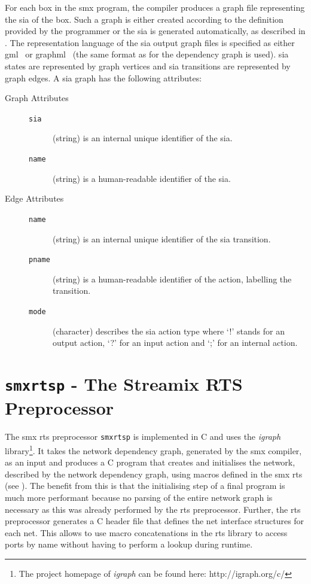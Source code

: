 For each box in the \gls*{smx} program, the compiler produces a graph file representing the \gls{sia} of the box.
Such a graph is either created according to the definition provided by the programmer or the \gls{sia} is generated automatically, as described in \Sect{\ref{sect_smx_box_sia}}.
The representation language of the \gls{sia} output graph files is specified as either \gls{gml}~\cite{himsolt1996} or \gls{graphml}~\cite{brandes2001} (the same format as for the dependency graph is used).
\Gls{sia} states are represented by graph vertices and \gls{sia} transitions are represented by graph edges.
A \gls{sia} graph has the following attributes:
\begin{description}
    \item[Graph Attributes] \hfill
        \begin{description}
            \item[\texttt{sia}] (string) is an internal unique identifier of the \gls{sia}.
            \item[\texttt{name}] (string) is a human-readable identifier of the \gls{sia}.
        \end{description}
    \item[Edge Attributes] \hfill
        \begin{description}
            \item[\texttt{name}] (string) is an internal unique identifier of the \gls{sia} transition.
            \item[\texttt{pname}] (string) is a human-readable identifier of the action, labelling the transition.
            \item[\texttt{mode}] (character) describes the \gls{sia} action type where `!' stands for an output action, `?' for an input action and `;' for an internal action.
        \end{description}
\end{description}

\section{\texttt{smxrtsp} - The Streamix RTS Preprocessor}
\label{sect_tool_smxrtsp}
The \gls*{smx} \gls{rts} preprocessor \texttt{smxrtsp} is implemented in C and uses the \emph{igraph} library\footnote{The project homepage of \emph{igraph} can be found here: http://igraph.org/c/}.
It takes the network dependency graph, generated by the \gls*{smx} compiler, as an input and produces a C program that creates and initialises the network, described by the network dependency graph, using macros defined in the \gls*{smx} \gls{rts} (see \Sect{\ref{sect_tool_rts}}).
The benefit from this is that the initialising step of a final program is much more performant because no parsing of the entire network graph is necessary as this was already performed by the \gls{rts} preprocessor.
Further, the \gls{rts} preprocessor generates a C header file that defines the net interface structures for each net.
This allows to use macro concatenations in the \gls{rts} library to access ports by name without having to perform a lookup during runtime.

